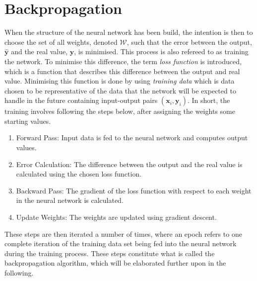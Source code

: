 \section{Backpropagation}
When the structure of the neural network has been build, the intention is then to choose the set of all weights, denoted $\mathcal{W}$, such that the error between the output, $\bm{\hat{y}}$ and the real value, $\bm{y}$, is minimised. This process is also refereed to as training the network. To minimise this difference, the term \emph{loss function} is introduced, which is a function that describes this difference between the output and real value. Minimising this function is done by using \emph{training data} which is data chosen to be representative of the data that the network will be expected to handle in the future containing input-output pairs $(\bm{x}_i,\bm{y}_i)$. In short, the training involves following the steps below, after assigning the weights some starting values.
\begin{enumerate}
    \item Forward Pass: Input data is fed to the neural network and computes output values. 
    \item Error Calculation: The difference between the output and the real value is calculated using the chosen loss function.
    \item Backward Pass: The gradient of the loss function with respect to each weight in the neural network is calculated.
    \item Update Weights: The weights are updated using gradient descent.
\end{enumerate}
These steps are then iterated a number of times, where an epoch refers to one complete iteration of the training data set being fed into the neural network during the training process. These steps constitute what is called the backpropagation algorithm, which will be elaborated further upon in the following. 

